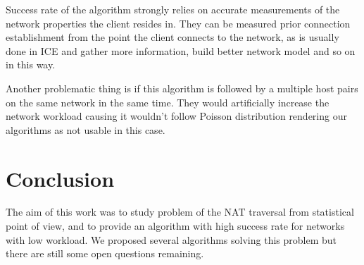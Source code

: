 \documentclass[twoside]{article}
\begin{document}
\begin{multicols}{2}
Success rate of the algorithm strongly relies on accurate measurements of the network 
properties the client resides in. They can be measured prior connection establishment 
from the point the client connects to the network, as is usually done in ICE and gather 
more information, build better network model and so on in this way.

Another problematic thing is if this algorithm is followed by a multiple host pairs on
the same network in the same time. They would artificially increase the network workload
causing it wouldn't follow Poisson distribution rendering our algorithms as not usable in
this case.

\section{Conclusion}
The aim of this work was to study problem of the NAT traversal from statistical point of view,
and to provide an algorithm with high success rate for networks with low workload. We proposed
several algorithms solving this problem but there are still some open questions remaining. 




\end{multicols}
\end{document}
